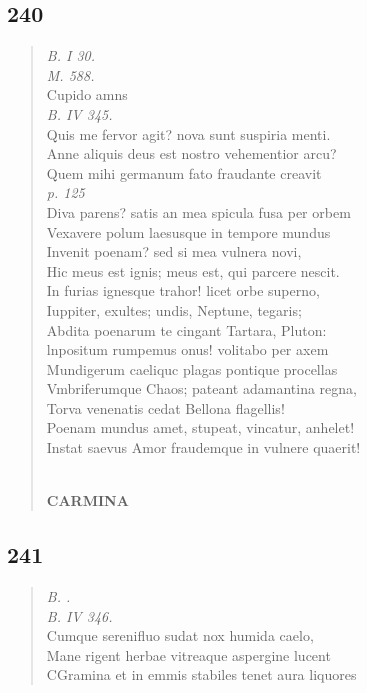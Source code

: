 \documentclass[11pt, a4paper]{report}
\begin{document}
            \subsection*{240}
      \begin{verse}
      \textit{B. I 30.} \\ \textit{M. 588.} \\ Cupido amns \\ \textit{B. IV 345.} \\ Quis me fervor agit? nova sunt suspiria menti. \\ Anne aliquis deus est nostro vehementior arcu? \\ Quem mihi germanum fato fraudante creavit \\ \textit{p. 125} \\ Diva parens?  \lbrack satis \rbrack  an  \lbrack mea \rbrack  spicula fusa per orbem \\ Vexavere polum laesusque in tempore mundus \\ Invenit poenam? sed si mea vulnera novi, \\ Hic meus est ignis; meus est, qui parcere nescit. \\ In furias ignesque trahor! licet orbe superno, \\ Iuppiter, exultes; undis, Neptune, tegaris; \\ Abdita poenarum te cingant Tartara, Pluton: \\ lnpositum rumpemus onus! volitabo per axem \\ Mundigerum caeliquc plagas pontique procellas \\ Vmbriferumque Chaos; pateant adamantina regna, \\ Torva venenatis cedat Bellona flagellis! \\ Poenam mundus amet, stupeat, vincatur, anhelet! \\ Instat saevus Amor fraudemque in vulnere quaerit! \\ 
        ﻿\pagebreak 
     \marginpar{[198]} \begin{center} \textbf{CARMINA} \end{center}
      \end{verse}
  
            \subsection*{241}
      \begin{verse}
      \textit{B. .} \\ \textit{B. IV 346.} \\ Cumque serenifluo sudat nox humida caelo, \\ Mane rigent herbae vitreaque aspergine lucent \\ CGramina et in emmis stabiles tenet aura liquores \\ 
      \end{verse}
  
\end{document}
